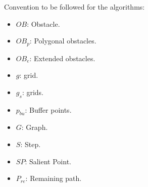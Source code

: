 Convention to be followed for the algorithms:
\begin{multicols}{2}
\begin{itemize}[noitemsep,topsep=0pt]
    \item $OB$: Obstacle.
    \item $OB_p$: Polygonal obstacles.
    \item $OB_e$: Extended obstacles.
    \item $g$: grid.
    \item $g_s$: grids.
    \item $p_{bu}$: Buffer points.
    \item $G$: Graph.
    \item $S$: Step.
    \item $SP$: Salient Point.
    \item $P_{re}$: Remaining path.
\end{itemize}
\end{multicols}
    



